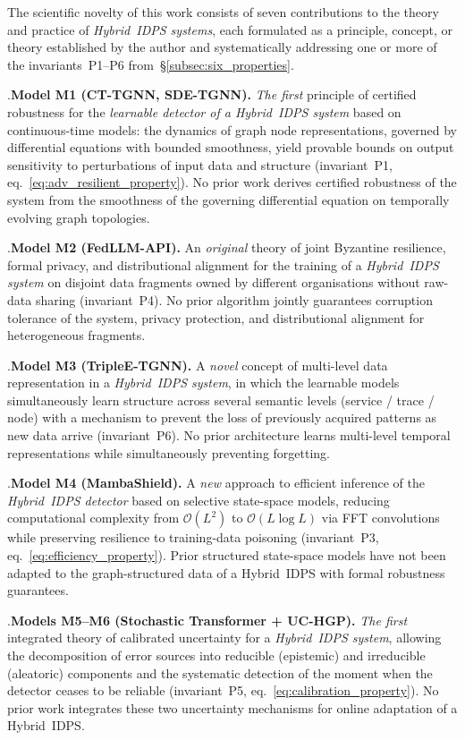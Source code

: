 The scientific novelty of this work consists of seven contributions
to the theory and practice of \emph{Hybrid~IDPS systems}, each
formulated as a principle, concept, or theory established by the
author and systematically addressing one or more of the
invariants~P1--P6 from~\S\ref{subsec:six_properties}.

.\quad \textbf{Model M1 (CT-TGNN, SDE-TGNN).}
\emph{The first} principle of certified robustness for the
\emph{learnable detector of a Hybrid~IDPS system} based on
continuous-time models: the dynamics of graph node
representations, governed by differential equations with bounded
smoothness, yield provable bounds on output sensitivity to
perturbations of input data and structure
(invariant~P1, eq.~\eqref{eq:adv_resilient_property}). No prior
work derives certified robustness of the system from the
smoothness of the governing differential equation on temporally
evolving graph topologies.

.\quad \textbf{Model M2 (FedLLM-API).} An \emph{original}
theory of joint Byzantine resilience, formal privacy, and
distributional alignment for the training of a \emph{Hybrid~IDPS
system} on disjoint data fragments owned by different
organisations without raw-data sharing (invariant~P4). No prior
algorithm jointly guarantees corruption tolerance of the system,
privacy protection, and distributional alignment for heterogeneous
fragments.

.\quad \textbf{Model M3 (TripleE-TGNN).} A \emph{novel}
concept of multi-level data representation in a \emph{Hybrid~IDPS
system}, in which the learnable models simultaneously learn
structure across several semantic levels (service / trace / node)
with a mechanism to prevent the loss of previously acquired
patterns as new data arrive (invariant~P6). No prior architecture
learns multi-level temporal representations while simultaneously
preventing forgetting.

.\quad \textbf{Model M4 (MambaShield).} A \emph{new}
approach to efficient inference of the \emph{Hybrid~IDPS detector}
based on selective state-space models, reducing computational
complexity from $\mathcal{O}(L^{2})$ to $\mathcal{O}(L\log L)$
via FFT convolutions while preserving resilience to training-data
poisoning (invariant~P3, eq.~\eqref{eq:efficiency_property}).
Prior structured state-space models have not been adapted to the
graph-structured data of a Hybrid~IDPS with formal robustness
guarantees.

.\quad \textbf{Models M5--M6 (Stochastic Transformer +
UC-HGP).} \emph{The first} integrated theory of calibrated
uncertainty for a \emph{Hybrid~IDPS system}, allowing the
decomposition of error sources into reducible (epistemic) and
irreducible (aleatoric) components and the systematic detection of
the moment when the detector ceases to be reliable
(invariant~P5, eq.~\eqref{eq:calibration_property}). No prior work
integrates these two uncertainty mechanisms for online adaptation
of a Hybrid~IDPS.

